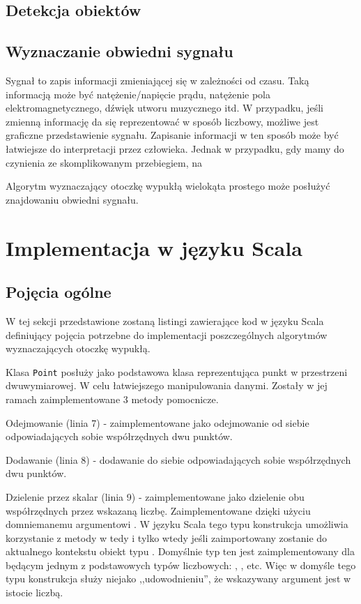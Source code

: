 		\section{Detekcja obiektów}
        \section{Wyznaczanie obwiedni sygnału}
        Sygnał to zapis informacji zmieniającej się w zależności od czasu. Taką informacją może być natężenie/napięcie prądu, natężenie pola elektromagnetycznego, dźwięk utworu muzycznego itd. W przypadku, jeśli zmienną informację da się  reprezentować w sposób liczbowy, możliwe jest graficzne przedstawienie sygnału. Zapisanie informacji w ten sposób może być łatwiejsze do interpretacji przez człowieka. Jednak w przypadku, gdy mamy do czynienia ze skomplikowanym przebiegiem, na
        
        Algorytm wyznaczający otoczkę wypukłą wielokąta prostego może posłużyć znajdowaniu obwiedni sygnału.
        
   \chapter{Implementacja w języku Scala}
   		\section{Pojęcia ogólne}
   		W tej sekcji przedstawione zostaną listingi zawierające kod w języku Scala definiujący pojęcia potrzebne do implementacji poszczególnych algorytmów wyznaczających otoczkę wypukłą.
   		
   		Klasa \texttt{Point} posłuży jako podstawowa klasa reprezentująca punkt w przestrzeni dwuwymiarowej. W celu łatwiejszego manipulowania danymi. Zostały w jej ramach zaimplementowane 3 metody pomocnicze.
   		
   		Odejmowanie (linia 7) - zaimplementowane jako odejmowanie od siebie odpowiadających sobie współrzędnych dwu punktów.
   		
   		Dodawanie (linia 8) - dodawanie do siebie odpowiadających sobie współrzędnych dwu punktów.
   		
   		Dzielenie przez skalar (linia 9) - zaimplementowane jako dzielenie obu współrzędnych przez wskazaną liczbę. Zaimplementowane dzięki użyciu domniemanemu argumentowi . W języku Scala tego typu konstrukcja umożliwia korzystanie z metody \scala{/} w tedy i tylko wtedy jeśli zaimportowany zostanie do aktualnego kontekstu obiekt typu . Domyślnie typ ten jest zaimplementowany dla  będącym jednym z podstawowych typów liczbowych: , ,  etc. Więc w domyśle tego typu konstrukcja służy niejako ,,udowodnieniu'', że wskazywany argument jest w istocie liczbą.
   		
